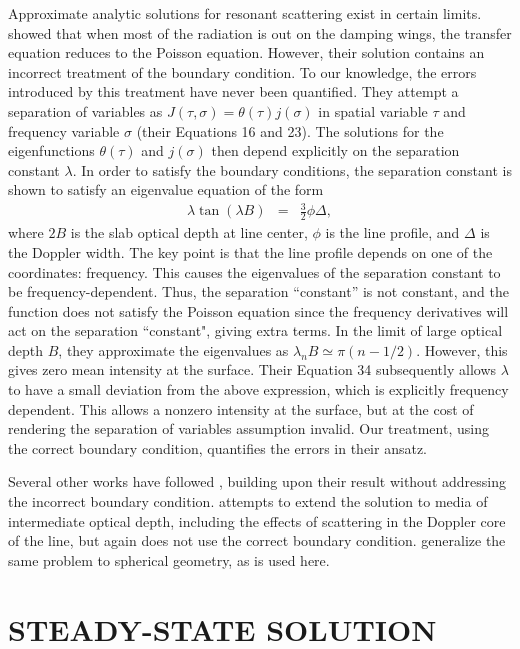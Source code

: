 \documentclass{aastex63}
\newcommand{\be}{\begin{eqnarray}}
\newcommand{\ee}{\end{eqnarray}}
\begin{document}
Approximate analytic solutions for resonant scattering exist in certain limits. \citet{1973MNRAS.162...43H} showed that when most of the radiation is out on the damping wings, the transfer equation reduces to the Poisson equation. However, their solution contains an incorrect treatment of the boundary condition. To our knowledge, the errors introduced by this treatment have never been quantified. They attempt a separation of variables as $J(\tau,\sigma) = \theta(\tau) j(\sigma)$ in spatial variable $\tau$ and frequency variable $\sigma$ (their Equations 16 and 23). The solutions for the eigenfunctions $\theta(\tau)$ and $j(\sigma)$ then depend explicitly on the separation constant $\lambda$. In order to satisfy the boundary conditions, the separation constant is shown to satisfy an eigenvalue equation of the form
\be
\lambda \tan(\lambda B) & = & \frac{3}{2} \phi \Delta,
\label{eq:evalue}
\ee
where $2B$ is the slab optical depth at line center, $\phi$ is the line profile, and $\Delta$ is the Doppler width. The key point is that the line profile depends on one of the coordinates: frequency. This causes the eigenvalues of the separation constant to be frequency-dependent. Thus, the separation ``constant'' is not constant, and the function does not satisfy the Poisson equation since the frequency derivatives will act on the separation ``constant", giving extra terms. In the limit of large optical depth $B$, they approximate the eigenvalues as $\lambda_n B \simeq \pi (n-1/2)$. However, this gives zero mean intensity at the surface. Their Equation 34 subsequently allows $\lambda$ to have a small deviation from the above expression, which is explicitly frequency dependent. This allows a nonzero intensity at the surface, but at the cost of rendering the separation of variables assumption invalid. Our treatment, using the correct boundary condition, quantifies the errors in their ansatz.

Several other works have followed \citet{1973MNRAS.162...43H}, building upon their result without addressing the incorrect boundary condition. \citet{1990ApJ...350..216N} attempts to extend the solution to media of intermediate optical depth, including the effects of scattering in the Doppler core of the line, but again does not use the correct boundary condition. \citet{2006ApJ...649...14D} generalize the same problem to spherical geometry, as is used here.

\section{STEADY-STATE SOLUTION}
\label{sec:steadystate}
\end{document}
